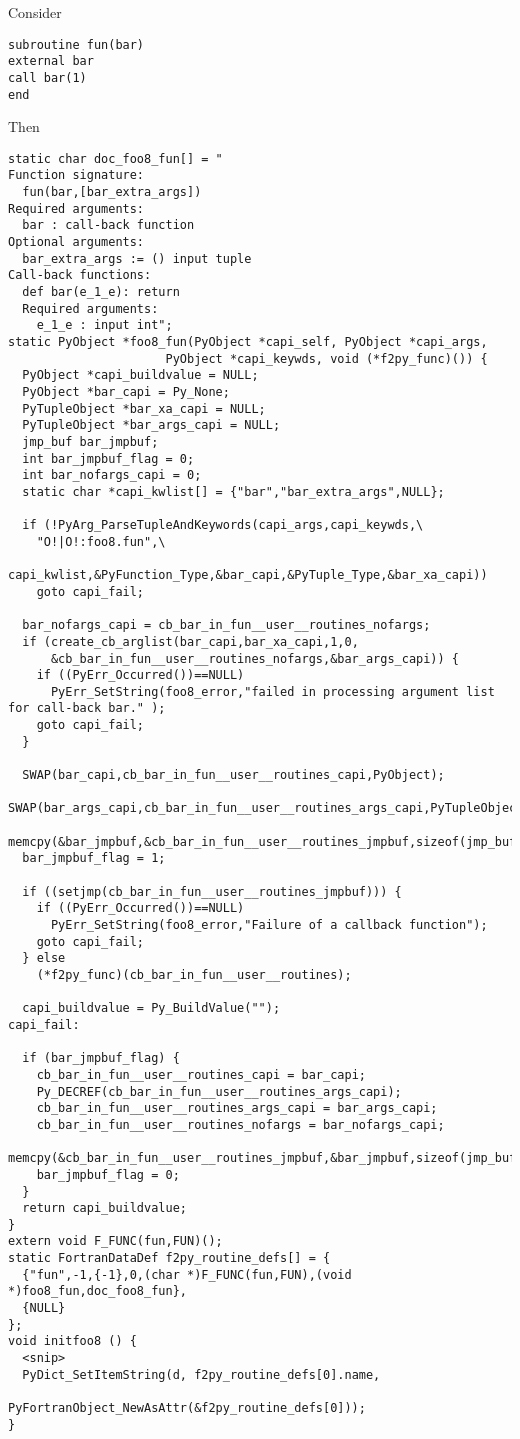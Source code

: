 \documentclass{article}
\begin{document}
Consider
\begin{verbatim}
subroutine fun(bar)
external bar
call bar(1)
end
\end{verbatim}
Then
\begin{verbatim}
static char doc_foo8_fun[] = "
Function signature:
  fun(bar,[bar_extra_args])
Required arguments:
  bar : call-back function
Optional arguments:
  bar_extra_args := () input tuple
Call-back functions:
  def bar(e_1_e): return
  Required arguments:
    e_1_e : input int";
static PyObject *foo8_fun(PyObject *capi_self, PyObject *capi_args, 
                      PyObject *capi_keywds, void (*f2py_func)()) {
  PyObject *capi_buildvalue = NULL;
  PyObject *bar_capi = Py_None;
  PyTupleObject *bar_xa_capi = NULL;
  PyTupleObject *bar_args_capi = NULL;
  jmp_buf bar_jmpbuf;
  int bar_jmpbuf_flag = 0;
  int bar_nofargs_capi = 0;
  static char *capi_kwlist[] = {"bar","bar_extra_args",NULL};

  if (!PyArg_ParseTupleAndKeywords(capi_args,capi_keywds,\
    "O!|O!:foo8.fun",\
    capi_kwlist,&PyFunction_Type,&bar_capi,&PyTuple_Type,&bar_xa_capi))
    goto capi_fail;

  bar_nofargs_capi = cb_bar_in_fun__user__routines_nofargs;
  if (create_cb_arglist(bar_capi,bar_xa_capi,1,0,
      &cb_bar_in_fun__user__routines_nofargs,&bar_args_capi)) {
    if ((PyErr_Occurred())==NULL)
      PyErr_SetString(foo8_error,"failed in processing argument list for call-back bar." );
    goto capi_fail;
  }

  SWAP(bar_capi,cb_bar_in_fun__user__routines_capi,PyObject);
  SWAP(bar_args_capi,cb_bar_in_fun__user__routines_args_capi,PyTupleObject);
  memcpy(&bar_jmpbuf,&cb_bar_in_fun__user__routines_jmpbuf,sizeof(jmp_buf));
  bar_jmpbuf_flag = 1;

  if ((setjmp(cb_bar_in_fun__user__routines_jmpbuf))) {
    if ((PyErr_Occurred())==NULL)
      PyErr_SetString(foo8_error,"Failure of a callback function");
    goto capi_fail;
  } else
    (*f2py_func)(cb_bar_in_fun__user__routines);

  capi_buildvalue = Py_BuildValue("");
capi_fail:

  if (bar_jmpbuf_flag) {
    cb_bar_in_fun__user__routines_capi = bar_capi;
    Py_DECREF(cb_bar_in_fun__user__routines_args_capi);
    cb_bar_in_fun__user__routines_args_capi = bar_args_capi;
    cb_bar_in_fun__user__routines_nofargs = bar_nofargs_capi;
    memcpy(&cb_bar_in_fun__user__routines_jmpbuf,&bar_jmpbuf,sizeof(jmp_buf));
    bar_jmpbuf_flag = 0;
  }
  return capi_buildvalue;
}
extern void F_FUNC(fun,FUN)();
static FortranDataDef f2py_routine_defs[] = {
  {"fun",-1,{-1},0,(char *)F_FUNC(fun,FUN),(void *)foo8_fun,doc_foo8_fun},
  {NULL}
};
void initfoo8 () {
  <snip>
  PyDict_SetItemString(d, f2py_routine_defs[0].name,
                       PyFortranObject_NewAsAttr(&f2py_routine_defs[0]));
}
\end{verbatim}
\end{document}
